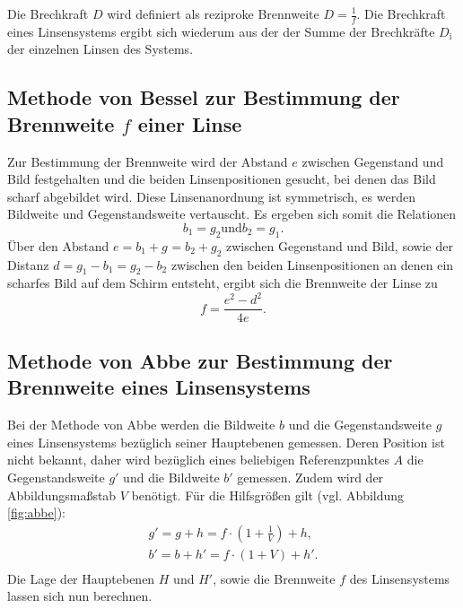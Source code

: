 Die Brechkraft $D$ wird definiert als reziproke Brennweite $D=\frac{1}{f}$. Die Brechkraft eines Linsensystems ergibt sich wiederum aus der der Summe der Brechkräfte $D_{\mathrm{i}}$ der einzelnen Linsen des Systems.
\FloatBarrier
\subsection{Methode von Bessel zur Bestimmung der Brennweite $f$ einer Linse}
Zur Bestimmung der Brennweite wird der Abstand $e$ zwischen Gegenstand und Bild festgehalten und die beiden Linsenpositionen gesucht, bei denen das Bild scharf abgebildet wird.
Diese Linsenanordnung ist symmetrisch, es werden Bildweite und Gegenstandsweite vertauscht.
Es ergeben sich somit die Relationen
\begin{equation}
b_{\mathrm{1}}=g_{\mathrm{2}} \text{und} b_{\mathrm{2}}=g_{\mathrm{1}} \text{.}
\end{equation}
Über den Abstand $e=b_{\mathrm{1}}+g_{\mathrm{}}=b_{\mathrm{2}}+g_{\mathrm{2}} $ zwischen Gegenstand und Bild, sowie der Distanz $d=g_{\mathrm{1}}-b_{\mathrm{1}}=g_{\mathrm{2}}-b_{\mathrm{2}}$ zwischen den beiden Linsenpositionen an denen ein scharfes Bild auf dem Schirm entsteht,
ergibt sich die Brennweite der Linse zu
\begin{equation}
  f=\frac{e^2-d^2}{4e}\text{.}
\end{equation}

\subsection{Methode von Abbe zur Bestimmung der Brennweite eines Linsensystems}
Bei der Methode von Abbe werden die Bildweite $b$ und die Gegenstandsweite $g$ eines Linsensystems bezüglich seiner Hauptebenen gemessen. Deren Position ist nicht bekannt, daher wird bezüglich eines beliebigen Referenzpunktes $A$ die Gegenstandsweite $g'$ und die Bildweite $b'$ gemessen.
Zudem wird der Abbildungsmaßstab $V$ benötigt.
Für die Hilfsgrößen gilt (vgl. Abbildung \ref{fig:abbe}):
\begin{gather}
  \label{eqn:abbe}
  g'=g+h=f\cdot\left(1+\frac{1}{V}\right)+h \text{,}\\
  b'=b+h'=f\cdot\left(1+V\right)+h' \text{.}\\
\end{gather}
Die Lage der Hauptebenen $H$ und $H'$, sowie die Brennweite $f$ des Linsensystems lassen sich nun berechnen.

